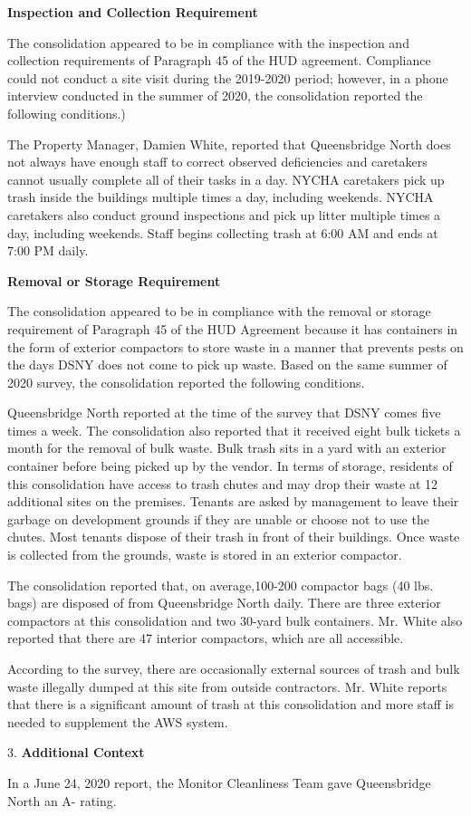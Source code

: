 
\textbf{Inspection and Collection Requirement}

The consolidation appeared to be in compliance with the inspection and collection requirements of Paragraph 45 of the HUD agreement. Compliance could not conduct a site visit during the 2019-2020 period; however, in a phone interview conducted in the summer of 2020, the consolidation reported the following conditions.)

The Property Manager, Damien White, reported that Queensbridge North does not always have enough staff to correct observed deficiencies and caretakers cannot usually complete all of their tasks in a day. NYCHA caretakers pick up trash inside the buildings multiple times a day, including weekends. NYCHA caretakers also conduct ground inspections and pick up litter multiple times a day, including weekends. Staff begins collecting trash at 6:00 AM and ends at 7:00 PM daily. 

\textbf{Removal or Storage Requirement}

The consolidation appeared to be in compliance with the  removal or storage requirement of Paragraph  45 of the HUD Agreement because it has containers in the form of exterior compactors to store waste in a manner that prevents pests on the days DSNY does not come to pick up waste. Based on the same summer of  2020 survey, the consolidation reported the following conditions.

Queensbridge North reported at the time of the survey that DSNY comes five times a week. The consolidation also reported that it received eight bulk tickets a month for the removal of bulk waste.  Bulk trash sits in a yard with an exterior container before being picked up by the vendor. In terms of storage, residents of this consolidation have access to trash chutes and may drop their waste at 12 additional sites on the premises. Tenants are asked by management to leave their garbage on development grounds if they are unable or choose not to use the chutes. Most tenants dispose of their trash in front of their buildings. Once waste is collected from the grounds, waste is stored in an exterior compactor. 

The consolidation reported that, on average,100-200 compactor bags (40 lbs. bags) are disposed of from Queensbridge North daily. There are three exterior compactors at this consolidation and two 30-yard bulk containers. Mr. White also reported that there are 47 interior compactors, which are all accessible.

According to the survey, there are occasionally external sources of trash and bulk waste illegally dumped at this site from outside contractors. Mr. White reports that there is a significant amount of trash at this consolidation and more staff is needed to supplement the AWS system.

3. \textbf{Additional Context} 

In a June 24, 2020 report, the Monitor Cleanliness Team gave Queensbridge North an A- rating. 